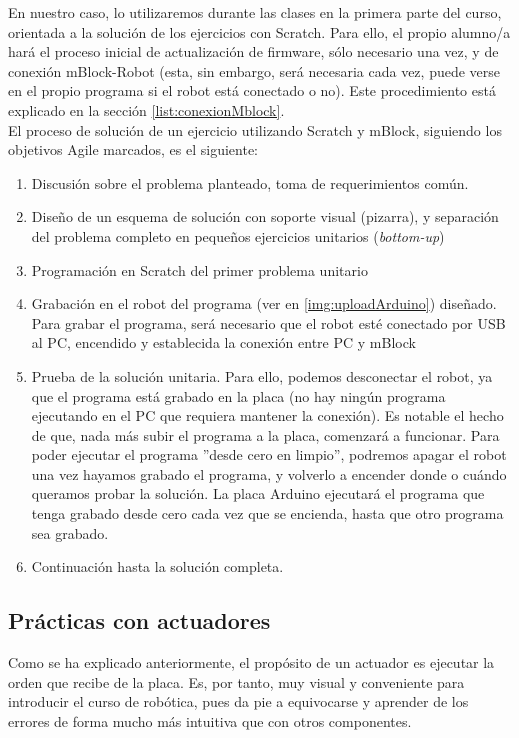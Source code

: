 En nuestro caso, lo utilizaremos durante las clases en la primera parte del curso, orientada a la solución de los ejercicios con Scratch. 
Para ello, el propio alumno/a hará el proceso inicial de actualización de firmware, sólo necesario una vez, y de conexión mBlock-Robot (esta, sin embargo, será necesaria cada vez, puede verse en el propio programa si el robot está conectado o no). Este procedimiento está explicado en la sección \ref{list:conexionMblock}. \\
El proceso de solución de un ejercicio utilizando Scratch y mBlock, siguiendo los objetivos Agile marcados, es el siguiente:
\begin{enumerate}
	\item Discusión sobre el problema planteado, toma de requerimientos común.
	\item Diseño de un esquema de solución con soporte visual (pizarra), y separación del problema completo en pequeños ejercicios unitarios (\textit{bottom-up})
	\item Programación en Scratch del primer problema unitario
	\item Grabación en el robot del programa (ver en \ref{img:uploadArduino}) diseñado. Para grabar el programa, será necesario que el robot esté conectado por USB al PC, encendido y establecida la conexión entre PC y mBlock
	\item Prueba de la solución unitaria. Para ello, podemos desconectar el robot, ya que el programa está grabado en la placa (no hay ningún programa ejecutando en el PC que requiera mantener la conexión). Es notable el hecho de que, nada más subir el programa a la placa, comenzará a funcionar. Para poder ejecutar el programa ''desde cero en limpio'', podremos apagar el robot una vez hayamos grabado el programa, y volverlo a encender donde o cuándo queramos probar la solución. La placa Arduino ejecutará el programa que tenga grabado desde cero cada vez que se encienda, hasta que otro programa sea grabado.
	\item Continuación hasta la solución completa.
\end{enumerate}
\subsection{Prácticas con actuadores} \label{subsec:practicasactuadores}
 Como se ha explicado anteriormente, el propósito de un actuador es ejecutar la orden que recibe de la placa. Es, por tanto, muy visual y conveniente para introducir el curso de robótica, pues da pie a equivocarse y aprender de los errores de forma mucho más intuitiva que con otros componentes.
 
